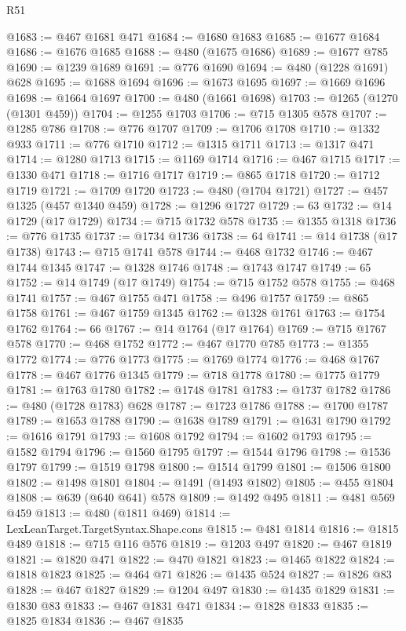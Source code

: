 \begin{lexlean}{R51}
\begin{coremodule}
@1683 := @467 @1681 @471
@1684 := @1680 @1683
@1685 := @1677 @1684
@1686 := @1676 @1685
@1688 := @480 (@1675 @1686)
@1689 := @1677 @785
@1690 := @1239 @1689
@1691 := @776 @1690
@1694 := @480 (@1228 @1691) @628
@1695 := @1688 @1694
@1696 := @1673 @1695
@1697 := @1669 @1696
@1698 := @1664 @1697
@1700 := @480 (@1661 @1698)
@1703 := @1265 (@1270 (@1301 @459))
@1704 := @1255 @1703
@1706 := @715 @1305 @578
@1707 := @1285 @786
@1708 := @776 @1707
@1709 := @1706 @1708
@1710 := @1332 @933
@1711 := @776 @1710
@1712 := @1315 @1711
@1713 := @1317 @471
@1714 := @1280 @1713
@1715 := @1169 @1714
@1716 := @467 @1715
@1717 := @1330 @471
@1718 := @1716 @1717
@1719 := @865 @1718
@1720 := @1712 @1719
@1721 := @1709 @1720
@1723 := @480 (@1704 @1721)
@1727 := @457 @1325 (@457 @1340 @459)
@1728 := @1296 @1727
@1729 := 63
@1732 := @14 @1729 (@17 @1729)
@1734 := @715 @1732 @578
@1735 := @1355 @1318
@1736 := @776 @1735
@1737 := @1734 @1736
@1738 := 64
@1741 := @14 @1738 (@17 @1738)
@1743 := @715 @1741 @578
@1744 := @468 @1732
@1746 := @467 @1744 @1345
@1747 := @1328 @1746
@1748 := @1743 @1747
@1749 := 65
@1752 := @14 @1749 (@17 @1749)
@1754 := @715 @1752 @578
@1755 := @468 @1741
@1757 := @467 @1755 @471
@1758 := @496 @1757
@1759 := @865 @1758
@1761 := @467 @1759 @1345
@1762 := @1328 @1761
@1763 := @1754 @1762
@1764 := 66
@1767 := @14 @1764 (@17 @1764)
@1769 := @715 @1767 @578
@1770 := @468 @1752
@1772 := @467 @1770 @785
@1773 := @1355 @1772
@1774 := @776 @1773
@1775 := @1769 @1774
@1776 := @468 @1767
@1778 := @467 @1776 @1345
@1779 := @718 @1778
@1780 := @1775 @1779
@1781 := @1763 @1780
@1782 := @1748 @1781
@1783 := @1737 @1782
@1786 := @480 (@1728 @1783) @628
@1787 := @1723 @1786
@1788 := @1700 @1787
@1789 := @1653 @1788
@1790 := @1638 @1789
@1791 := @1631 @1790
@1792 := @1616 @1791
@1793 := @1608 @1792
@1794 := @1602 @1793
@1795 := @1582 @1794
@1796 := @1560 @1795
@1797 := @1544 @1796
@1798 := @1536 @1797
@1799 := @1519 @1798
@1800 := @1514 @1799
@1801 := @1506 @1800
@1802 := @1498 @1801
@1804 := @1491 (@1493 @1802)
@1805 := @455 @1804
@1808 := @639 (@640 @641) @578
@1809 := @1492 @495
@1811 := @481 @569 @459
@1813 := @480 (@1811 @469)
@1814 := LexLeanTarget.TargetSyntax.Shape.cons
@1815 := @481 @1814
@1816 := @1815 @489
@1818 := @715 @116 @576
@1819 := @1203 @497
@1820 := @467 @1819
@1821 := @1820 @471
@1822 := @470 @1821
@1823 := @1465 @1822
@1824 := @1818 @1823
@1825 := @464 @71
@1826 := @1435 @524
@1827 := @1826 @83
@1828 := @467 @1827
@1829 := @1204 @497
@1830 := @1435 @1829
@1831 := @1830 @83
@1833 := @467 @1831 @471
@1834 := @1828 @1833
@1835 := @1825 @1834
@1836 := @467 @1835

\end{coremodule}
\end{lexlean}
